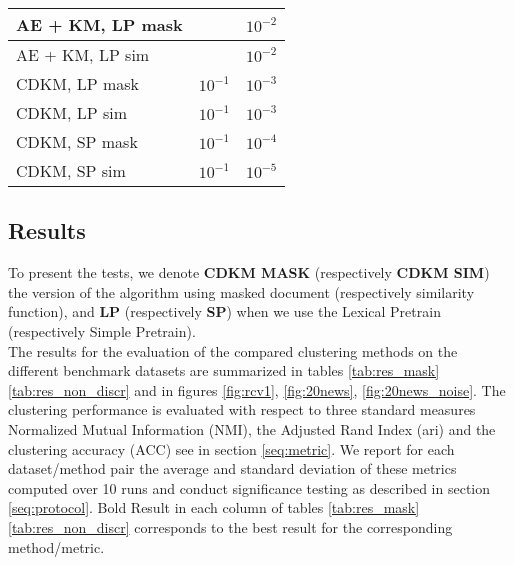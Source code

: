 \begin{table}[!h]
{\begin{tabular}{|l|l|l|}
    AE + KM, LP mask  &\cellcolor{gray}  &$10^{-2}$         \\ \hline
    AE + KM, LP sim   &\cellcolor{gray}  &$10^{-2}$         \\ \hline
       CDKM, LP mask  &$10^{-1}$  &$10^{-3}$         \\ \hline
       CDKM, LP sim   &$10^{-1}$  &$10^{-3}$         \\ \hline
       CDKM, SP mask  &$10^{-1}$  &$10^{-4}$         \\ \hline
       CDKM, SP sim   &$10^{-1}$  &$10^{-5}$         \\ \hline
\end{tabular}
}
\end{table}
\subsection{\label{seq:results}Results}
To present the tests, we denote \textbf{CDKM MASK} (respectively \textbf{CDKM SIM}) the version of 
the algorithm using masked document (respectively similarity function), and \textbf{LP}
(respectively \textbf{SP}) when we use the Lexical Pretrain (respectively Simple Pretrain).
\\The results for the evaluation of the compared clustering methods on the 
different benchmark datasets are summarized in tables \ref{tab:res_mask} 
\ref{tab:res_non_discr} and in figures \ref{fig:rcv1}, \ref{fig:20news},
\ref{fig:20news_noise}. The clustering performance is evaluated with respect to
three standard measures Normalized Mutual Information (NMI), the Adjusted Rand 
Index (ari) and the clustering accuracy (ACC) see in section \ref{seq:metric}. 
We report for each dataset/method pair the average and standard deviation of 
these metrics computed over 10 runs and conduct significance testing as 
described in section \ref{seq:protocol}. Bold Result in each column of tables 
\ref{tab:res_mask} \ref{tab:res_non_discr} corresponds to the best result for 
the corresponding method/metric.
